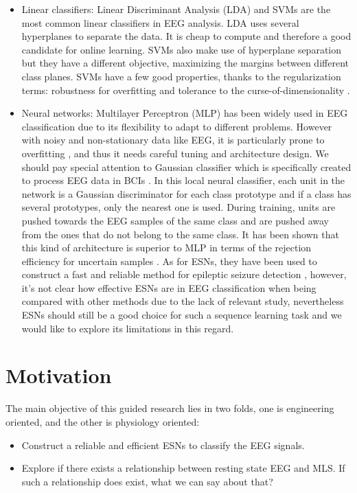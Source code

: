 \documentclass[a4paper,11pt,oneside]{article}
\begin{document}
\begin{itemize}
	\item Linear classifiers: Linear Discriminant Analysis (LDA)  and SVMs are the most common linear classifiers in EEG analysis. LDA uses several hyperplanes to separate the data. It is cheap to compute and therefore a good candidate for online learning. SVMs also make use of hyperplane separation but they have a different objective, maximizing the margins between different class planes. SVMs have a few good properties, thanks to the regularization terms:  robustness for overfitting and tolerance to the curse-of-dimensionality \cite{bennett2000support}.
	
	\item Neural networks: Multilayer Perceptron (MLP)  has been widely used in EEG classification \cite{anderson1996classification}\cite{palaniappan2005brain} due to its flexibility to adapt to different problems. However with noisy and non-stationary data like EEG, it is particularly prone to overfitting \cite{balakrishnan2005multilayer}, and thus it needs careful tuning and architecture design. We should pay special attention to Gaussian classifier which is specifically created to process EEG data in BCIs \cite{millan2004noninvasive} \cite{millan2000local}. In this local neural classifier, each unit in the network is a Gaussian discriminator for each class prototype and if a class has several prototypes, only the nearest one is used. During training, units are pushed towards the EEG samples of the same class and are pushed away from the ones that do not belong to the same class. It has been shown that this kind of architecture is superior to MLP in terms of the rejection efficiency for uncertain samples \cite{millan2000local}. As for ESNs,  they have been used to construct a fast and reliable method for epileptic seizure detection \cite{buteneers2008real}, however, it's not clear how effective ESNs are in EEG classification when being compared with other methods due to the lack of relevant study, nevertheless ESNs should still be a good choice for such a sequence learning task and we would like to explore its limitations in this regard.

\end{itemize}


\section{Motivation}
The main objective of this guided research lies in two folds, one is engineering oriented, and the other is physiology oriented:
\begin{itemize}
	\item Construct a reliable and efficient ESNs to classify the EEG signals.
	\item Explore if there exists a relationship between resting state EEG and MLS. If such a relationship does exist, what we can say about that?
\end{itemize} 
\end{document}
